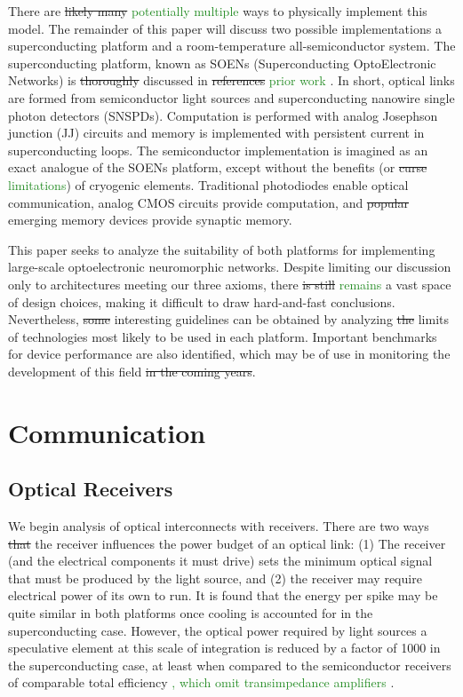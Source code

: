 \documentclass[twocolumn]{article}
\begin{document}
There are \sout{likely many} \textcolor{ForestGreen}{potentially multiple} ways to physically implement this model. The remainder of this paper will discuss two possible implementations \textemdash a superconducting platform and a room-temperature all-semiconductor system. The superconducting platform, known as SOENs (Superconducting OptoElectronic Networks) is \sout{thoroughly} discussed in \sout{references} \textcolor{ForestGreen}{prior work} \cite{shainline2017superconducting, shainline2019superconducting, shainline2019fluxonic, sh2021}. In short, optical links are formed from semiconductor light sources and superconducting nanowire single photon detectors (SNSPDs). Computation is performed with analog Josephson junction (JJ) circuits and memory is implemented with persistent current in superconducting loops. The semiconductor implementation is imagined as an exact analogue of the SOENs platform, except without the benefits (or \sout{curse} \textcolor{ForestGreen}{limitations}) of cryogenic elements. Traditional photodiodes enable optical communication, analog CMOS circuits provide computation, and \sout{popular} emerging memory devices provide synaptic memory.

This paper seeks to analyze the suitability of both platforms for implementing large-scale optoelectronic neuromorphic networks. Despite limiting our discussion only to architectures meeting our three axioms, there \sout{is still} \textcolor{ForestGreen}{remains} a vast space of design choices, making it difficult to draw hard-and-fast conclusions. Nevertheless, \sout{some} interesting guidelines can be obtained by analyzing \sout{the} limits of technologies most likely to be used in each platform. Important benchmarks for device performance are also identified, which may be of use in monitoring the development of this field\sout{ in the coming years}.

\section{\label{sec:communication}Communication}
\subsection{Optical Receivers}
We begin analysis of optical interconnects with receivers. There are two ways \sout{that} the receiver influences the power budget of an optical link: (1) The receiver (and the electrical components it must drive) sets the minimum optical signal that must be produced by the light source, and (2) the receiver may require electrical power of its own to run. It is found that the energy per spike may be quite similar in both platforms once cooling is accounted for in the superconducting case. However, the optical power required by light sources \textemdash a speculative element at this scale of integration \textemdash is reduced by a factor of 1000 in the superconducting case, at least when compared to the semiconductor receivers of comparable total efficiency \textcolor{ForestGreen}{, which omit transimpedance amplifiers \cite{miller2017attojoule}}.
\end{document}
